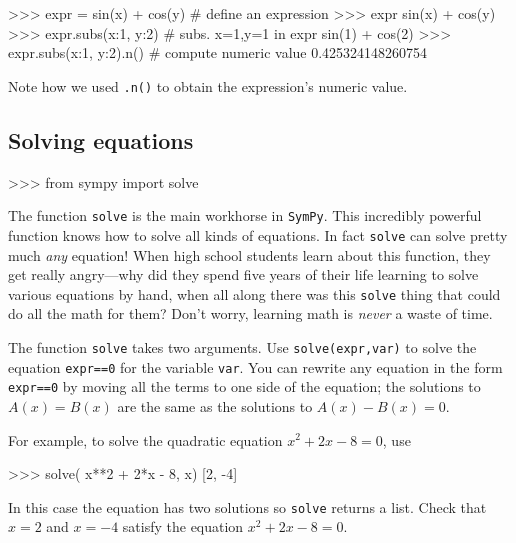 \small
\begin{verbatimtab}
>>> expr  = sin(x) + cos(y)          # define an expression
>>> expr
sin(x) + cos(y)
>>> expr.subs({x:1, y:2})            # subs. x=1,y=1 in expr
sin(1) + cos(2)
>>> expr.subs({x:1, y:2}).n()        # compute numeric value
0.425324148260754
\end{verbatimtab}
\normalsize

\noindent
Note how we used \texttt{.n()} to obtain the expression's numeric value.

\subsection{Solving equations}
\label{basics:solving_equations}

\small
\begin{verbatimtab}
>>> from sympy import solve
\end{verbatimtab}
\normalsize

\noindent
The function \texttt{solve} is the main workhorse in \texttt{SymPy}. 
This incredibly powerful function knows how to solve all kinds of equations.
In fact \texttt{solve} can solve pretty much \emph{any} equation!
When high school students learn about this function, they get really angry---why 
did they spend five years of their life learning to solve various equations by hand,
when all along there was this \texttt{solve} thing that could do all the math for them?
Don't worry, learning math is \emph{never} a waste of time.


The function \texttt{solve} takes two arguments.
Use \texttt{solve(expr,var)} to solve the equation \texttt{expr==0} for the variable \texttt{var}.
You can rewrite any equation in the form \texttt{expr==0} by moving all the terms to one side of the equation;
the solutions to $A(x)=B(x)$ are the same as the solutions to $A(x)-B(x)=0$.

For example, 
to solve the quadratic equation $x^2+2x-8=0$, use

\small
\begin{verbatimtab}
>>> solve( x**2 + 2*x - 8, x)
[2, -4]
\end{verbatimtab}
\normalsize

\noindent
In this case the equation has two solutions so \texttt{solve} returns a list.
Check that $x=2$ and $x=-4$ satisfy the equation $x^2+2x-8=0$.

